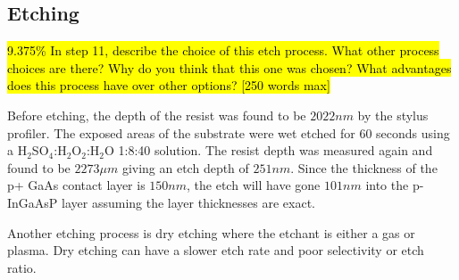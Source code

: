 \subsection{Etching}
\label{sec:fab:etching}

\hl{9.375\% In step 11, describe the choice of this etch process. What other process choices are there? Why do you think that this one was chosen? What advantages does this process have over other options? [250 words max]}

Before etching, the depth of the resist was found to be $2022nm$ by the stylus profiler. The exposed areas of the substrate were wet etched for 60 seconds using a H$_{2}$SO$_{4}$:H$_{2}$O$_{2}$:H$_{2}$O 1:8:40 solution. The resist depth was measured again and found to be $2273\mu m$ giving an etch depth of $251nm$. Since the thickness of the p+ GaAs contact layer is $150nm$, the etch will have gone $101nm$ into the p-InGaAsP layer assuming the layer thicknesses are exact.

Another etching process is dry etching where the etchant is either a gas or plasma. Dry etching can have a slower etch rate and poor selectivity or etch ratio.
